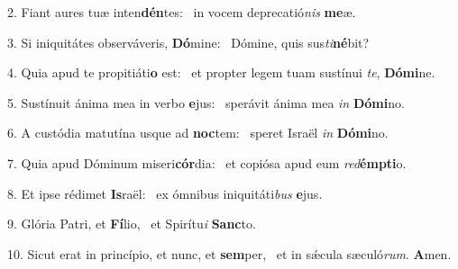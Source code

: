 2. Fiant aures tuæ inten\textbf{dén}tes: \ast\  in vocem deprecatió\textit{nis} \textbf{me}æ.\

3. Si iniquitátes observáveris, \textbf{Dó}mine: \ast\  Dómine, quis sus\textit{ti}\textbf{né}bit?\

4. Quia apud te propitiáti\textbf{o} est: \ast\  et propter legem tuam sustínui \textit{te}, \textbf{Dó}\textbf{mi}ne.\

5. Sustínuit ánima mea in verbo \textbf{e}jus: \ast\  sperávit ánima mea \textit{in} \textbf{Dó}\textbf{mi}no.\

6. A custódia matutína usque ad \textbf{noc}tem: \ast\  speret Israël \textit{in} \textbf{Dó}\textbf{mi}no.\

7. Quia apud Dóminum miseri\textbf{cór}dia: \ast\  et copiósa apud eum \textit{red}\textbf{émp}\textbf{ti}o.\

8. Et ipse rédimet \textbf{Is}raël: \ast\  ex ómnibus iniquitáti\textit{bus} \textbf{e}jus.\

9. Glória Patri, et \textbf{Fí}lio, \ast\  et Spirítu\textit{i} \textbf{Sanc}to.\

10. Sicut erat in princípio, et nunc, et \textbf{sem}per, \ast\  et in sǽcula sæculó\textit{rum}. \textbf{A}men.\

